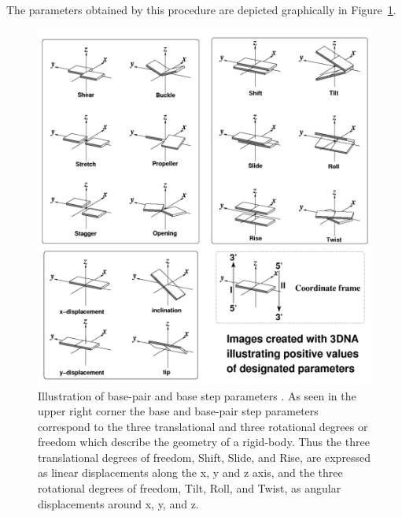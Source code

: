 The parameters obtained by  this procedure are depicted graphically in
Figure~\ref{fig:allparam}.
\begin{figure}[htbp]
\centering
\includegraphics[scale=0.6]{Chapter1/allparam2.png}
\caption{Illustration   of   base-pair   and  base   step   parameters
  \cite{lu2003}.   As seen  in the  upper  right corner  the base  and
  base-pair step parameters correspond  to the three translational and
  three rotational degrees or freedom which describe the geometry of a
  rigid-body. Thus the three  translational degrees of freedom, Shift,
  Slide, and Rise, are expressed  as linear displacements along the x,
  y and  z axis,  and the three  rotational degrees of  freedom, Tilt,
  Roll, and Twist, as angular displacements around x, y, and z.}
\label{fig:allparam}
\end{figure}


